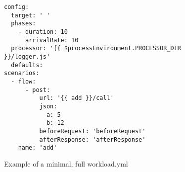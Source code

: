 \documentclass[../main.tex]{subfiles}
\begin{document}
\begin{figure}[H]
  \begin{tcolorbox}[titleDetachedStyle, title=\texttt{workload.yml}]
  \begin{verbatim}
config:
  target: ' '
  phases:
    - duration: 10
      arrivalRate: 10
  processor: '{{ $processEnvironment.PROCESSOR_DIR }}/logger.js'
  defaults:
scenarios:
  - flow:
      - post:
          url: '{{ add }}/call'
          json:
            a: 5
            b: 12
          beforeRequest: 'beforeRequest'
          afterResponse: 'afterResponse'
    name: 'add'
\end{verbatim}
\end{tcolorbox}
\caption{Example of a minimal, full workload.yml}%
\label{fig:exampleWorkloadYML}
\end{figure}
\end{document}
